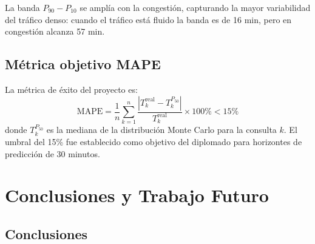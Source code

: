 \documentclass[12pt, a4paper]{article}
\theoremstyle{definition}
\begin{document}
La banda $P_{90} - P_{10}$ se amplía con la congestión, capturando la mayor
variabilidad del tráfico denso: cuando el tráfico está fluido la banda es de
16 min, pero en congestión alcanza 57 min.

\subsection{Métrica objetivo MAPE}

La métrica de éxito del proyecto es:
\begin{equation}
    \text{MAPE} = \frac{1}{n} \sum_{k=1}^{n}
                  \frac{|T^\text{real}_k - T^{P_{50}}_k|}{T^\text{real}_k}
                  \times 100\% < 15\%
    \label{eq:mape}
\end{equation}
donde $T^{P_{50}}_k$ es la mediana de la distribución Monte Carlo para la
consulta $k$. El umbral del 15\% fue establecido como objetivo del diplomado
para horizontes de predicción de 30 minutos.

\section{Conclusiones y Trabajo Futuro}

\subsection{Conclusiones}
\end{document}
